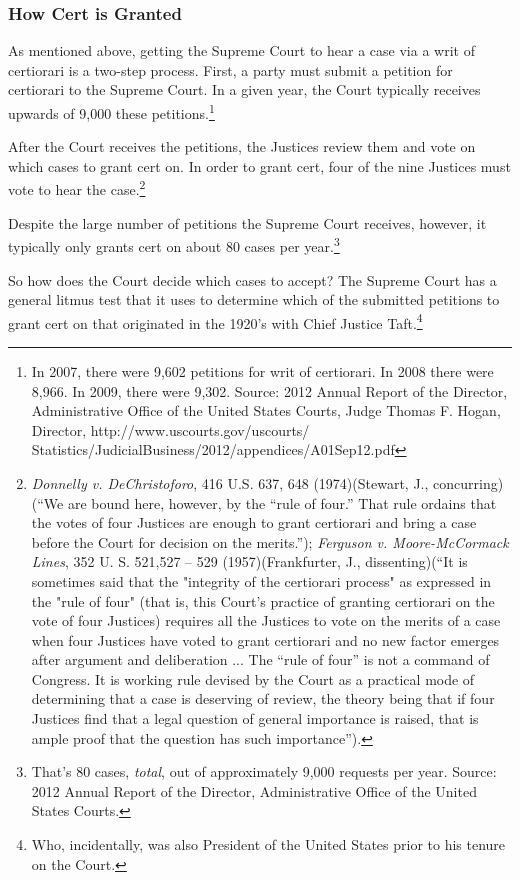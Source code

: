 \subsubsection{How Cert is Granted}
As mentioned above, getting the Supreme Court to hear a case via a writ of certiorari is a two-step process.  First, a party must submit a petition for certiorari to the Supreme Court.  In a given year, the Court typically receives upwards of 9,000 these petitions.\footnote{ In 2007, there were 9,602 petitions for writ of certiorari.  In 2008 there were 8,966.  In 2009, there were 9,302.  Source: 
2012 Annual Report of the Director, Administrative Office of the United States Courts, Judge Thomas F. Hogan, Director, http://www.uscourts.gov/uscourts/ Statistics/JudicialBusiness/2012/appendices/A01Sep12.pdf}  

After the Court receives the petitions, the Justices review them and vote on which cases to grant cert on.  In order to grant cert, four of the nine Justices must vote to hear the case.\footnote{\textit{Donnelly v. DeChristoforo}, 416 U.S. 637, 648 (1974)(Stewart, J., concurring)(``We are bound here, however, by the ``rule of four.'' That rule ordains that the votes of four Justices are enough to grant certiorari and bring a case before the Court for decision on the merits.''); \textit{Ferguson v. Moore-McCormack Lines}, 352 U. S. 521,527 -- 529 (1957)(Frankfurter, J., dissenting)(``It is sometimes said that the "integrity of the certiorari process" as expressed in the "rule of four" (that is, this Court's practice of granting certiorari on the vote of four Justices) requires all the Justices to vote on the merits of a case when four Justices have voted to grant certiorari and no new factor emerges after argument and deliberation ... The ``rule of four'' is not a command of Congress. It is working rule devised by the Court as a practical mode of determining that a case is deserving of review, the theory being that if four Justices find that a legal question of general importance is raised, that is ample proof that the question has such importance'').}

Despite the large number of petitions the Supreme Court receives, however, it typically only grants cert on about 80 cases per year.\footnote{That's 80 cases, \textit{total}, out of approximately 9,000 requests per year.  Source: 2012 Annual Report of the Director, Administrative Office of the United States Courts.}


So how does the Court decide which cases to accept?  The Supreme Court has a general litmus test that it uses to determine which of the submitted petitions to grant cert on that originated in the 1920's with Chief Justice Taft.\footnote{Who, incidentally, was also President of the United States prior to his tenure on the Court.}  

